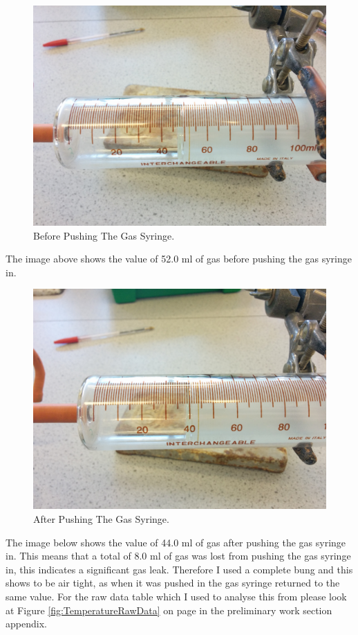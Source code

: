 \begin{figure}[H]
    \includegraphics[width=\textwidth]{./preliminarywork/images/BeforePush.jpg}
    \caption{Before Pushing The Gas Syringe.} \label{fig:BeforePush}
\end{figure}

The image above shows the value of 52.0 ml of gas before pushing the gas syringe in.

\begin{figure}[H]
    \includegraphics[width=\textwidth]{./preliminarywork/images/AfterPush.jpg}
    \caption{After Pushing The Gas Syringe.} \label{fig:AfterPush}
\end{figure}

The image below shows the value of 44.0 ml of gas after pushing the gas syringe in. This means that a total of 8.0 ml of gas was lost from pushing the gas syringe in, this indicates a significant gas leak. Therefore I used a complete bung and this shows to be air tight, as when it was pushed in the gas syringe returned to the same value. For the raw data table which I used to analyse this from please look at Figure \ref{fig:TemperatureRawData} on page \pageref{fig:TemperatureRawData} in the preliminary work section appendix.



